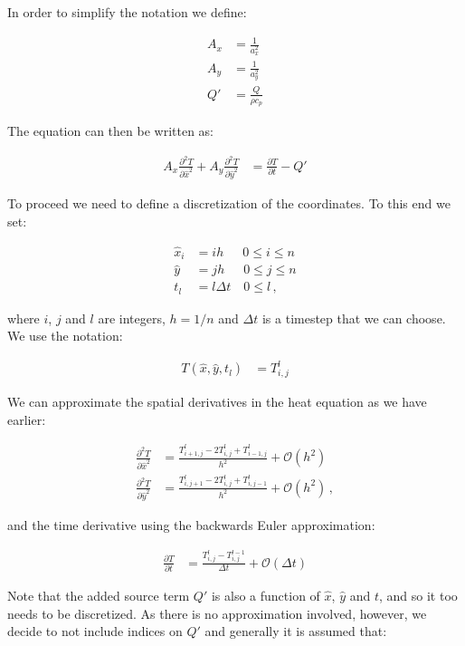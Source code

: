 \documentclass[reprint,english,notitlepage]{revtex4-1}  %
\begin{document}
In order to simplify the notation we define:

\begin{align*}
A_x &= \frac{1}{a_x^2} \\
A_y &= \frac{1}{a_y^2} \\
Q' &= \frac{Q}{\rho c_p}
\end{align*}

The equation can then be written as:

\begin{align*}
A_x \frac{\partial^2 T}{\partial \hat{x}^2} + A_y \frac{\partial^2 T}{\partial \hat{y}^2} &=  \frac{\partial T}{\partial t} - Q'
\end{align*}

To proceed we need to define a discretization of the coordinates. To this end we set:

\begin{align*}
\hat{x}_i &= i h \quad \,\,\, 0 \leq i \leq n \\
\hat{y} &= j h \quad \,\,\, 0 \leq j \leq n \\
t_l &= l \Delta t \quad 0 \leq l \, ,
\end{align*}

where $i$, $j$ and $l$ are integers, $h = 1/n$ and $\Delta t$ is a timestep that we can choose. We use the notation:

\begin{align*}
T(\hat{x},\hat{y},t_l) &= T_{i,j}^l 
\end{align*}

We can approximate the spatial derivatives in the heat equation as we have earlier:

\begin{align*}
\frac{\partial^2 T}{\partial \hat{x}^2} &= \frac{T_{i+1,j}^l - 2 T_{i,j}^l + T_{i-1,j}^l}{h^2} + \mathcal{O}(h^2) \\
\frac{\partial^2 T}{\partial \hat{y}^2} &= \frac{T_{i,j+1}^l - 2 T_{i,j}^l + T_{i,j-1}^l}{h^2} + \mathcal{O}(h^2) \, ,
\end{align*}

and the time derivative using the backwards Euler approximation:

\begin{align*}
\frac{\partial T}{\partial t} &= \frac{T_{i,j}^l - T_{i,j}^{l-1}}{\Delta t} + \mathcal{O}(\Delta t)
\end{align*}

Note that the added source term $Q'$ is also a function of $\hat{x}$, $\hat{y}$ and $t$, and so it too needs to be discretized. As there is no approximation involved, however, we decide to not include indices on $Q'$ and generally it is assumed that:
\end{document}
